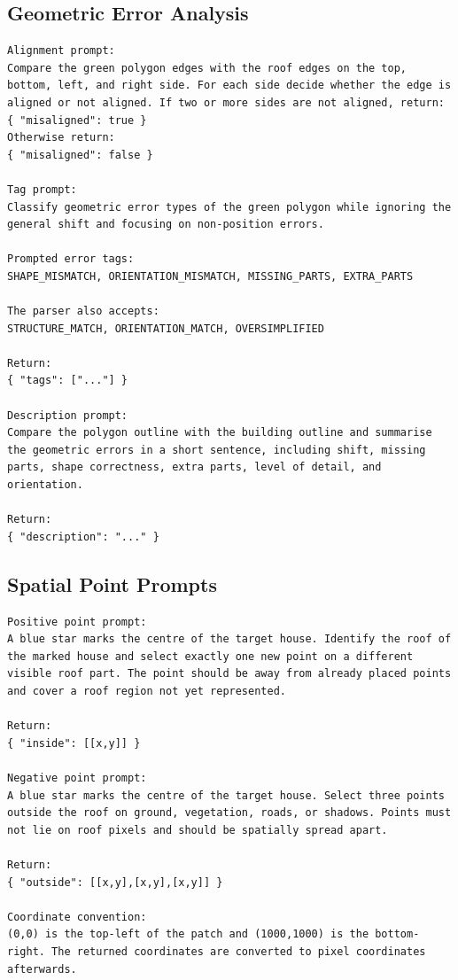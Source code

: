 \subsection*{Geometric Error Analysis}
\begin{lstlisting}[basicstyle=\ttfamily\small,breaklines=true]
Alignment prompt:
Compare the green polygon edges with the roof edges on the top, bottom, left, and right side. For each side decide whether the edge is aligned or not aligned. If two or more sides are not aligned, return:
{ "misaligned": true }
Otherwise return:
{ "misaligned": false }

Tag prompt:
Classify geometric error types of the green polygon while ignoring the general shift and focusing on non-position errors.

Prompted error tags:
SHAPE_MISMATCH, ORIENTATION_MISMATCH, MISSING_PARTS, EXTRA_PARTS

The parser also accepts:
STRUCTURE_MATCH, ORIENTATION_MATCH, OVERSIMPLIFIED

Return:
{ "tags": ["..."] }

Description prompt:
Compare the polygon outline with the building outline and summarise the geometric errors in a short sentence, including shift, missing parts, shape correctness, extra parts, level of detail, and orientation.

Return:
{ "description": "..." }
\end{lstlisting}

\subsection*{Spatial Point Prompts}
\begin{lstlisting}[basicstyle=\ttfamily\small,breaklines=true]
Positive point prompt:
A blue star marks the centre of the target house. Identify the roof of the marked house and select exactly one new point on a different visible roof part. The point should be away from already placed points and cover a roof region not yet represented.

Return:
{ "inside": [[x,y]] }

Negative point prompt:
A blue star marks the centre of the target house. Select three points outside the roof on ground, vegetation, roads, or shadows. Points must not lie on roof pixels and should be spatially spread apart.

Return:
{ "outside": [[x,y],[x,y],[x,y]] }

Coordinate convention:
(0,0) is the top-left of the patch and (1000,1000) is the bottom-right. The returned coordinates are converted to pixel coordinates afterwards.
\end{lstlisting}

